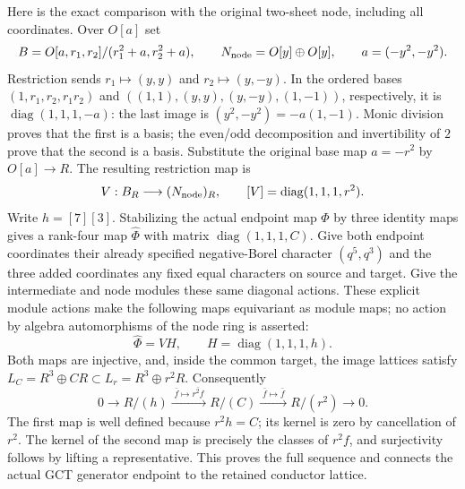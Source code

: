 Here is the exact comparison with the original two-sheet node, including
all coordinates. Over $O[a]$ set
\[
 B=O[a,r_1,r_2]/(r_1^2+a,r_2^2+a),\qquad
 N_{\rm node}=O[y]\oplus O[y],\qquad a=(-y^2,-y^2).
\]
Restriction sends $r_1\mapsto(y,y)$ and $r_2\mapsto(y,-y)$.
In the ordered bases
$(1,r_1,r_2,r_1r_2)$ and
$((1,1),(y,y),(y,-y),(1,-1))$, respectively, it is
$\operatorname{diag}(1,1,1,-a)$: the last image is
$(y^2,-y^2)=-a(1,-1)$. Monic division proves that the first is a
basis; the even/odd decomposition and invertibility of $2$ prove
that the second is a basis. Substitute the original base map
$a=-r^2$ by $O[a]\to R$. The resulting restriction map is
\[
 V:B_R\longrightarrow (N_{\rm node})_R,
 \qquad [V]=\operatorname{diag}(1,1,1,r^2).
\]
Write $h=[7][3]$. Stabilizing the actual endpoint map $\Phi$ by
three identity maps gives a rank-four map $\widehat\Phi$ with matrix
$\operatorname{diag}(1,1,1,C)$. Give both endpoint coordinates
their already specified negative-Borel character $(q^5,q^3)$ and
the three added coordinates any fixed equal characters on source
and target. Give the intermediate and node modules these same
diagonal actions. These explicit module actions make the following
maps equivariant as module maps; no action by algebra automorphisms
of the node ring is asserted:
\[
 \widehat\Phi=VH,\qquad H=\operatorname{diag}(1,1,1,h).
\]
Both maps are injective, and, inside the common target, the image
lattices satisfy $L_C=R^3\oplus CR\subset L_r=R^3\oplus r^2R$.
Consequently
\[
 0\longrightarrow R/(h)\xrightarrow{\;\bar f\mapsto\overline{r^2f}\;}
 R/(C)\xrightarrow{\;\bar f\mapsto\bar f\;}R/(r^2)
 \longrightarrow0.
\]
The first map is well defined because $r^2h=C$; its kernel is zero
by cancellation of $r^2$. The kernel of the second map is precisely
the classes of $r^2f$, and surjectivity follows by lifting a
representative. This proves the full sequence and connects the actual
GCT generator endpoint to the retained conductor lattice.

